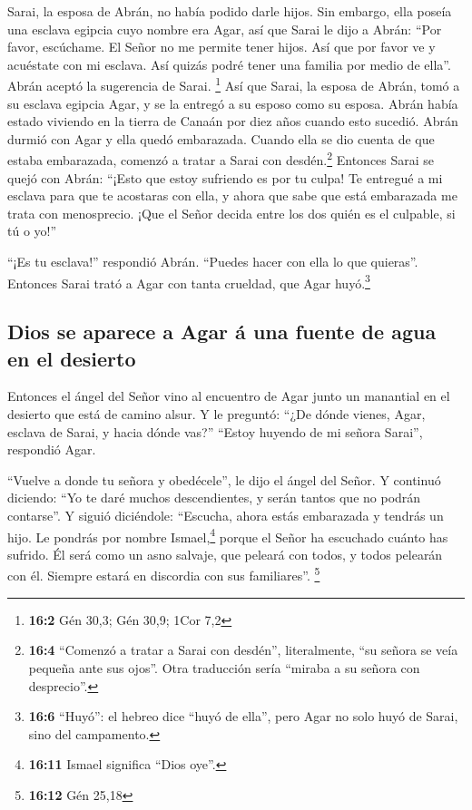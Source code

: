  Sarai, la esposa de Abrán, no había podido darle hijos.
Sin embargo, ella poseía una esclava egipcia cuyo nombre era Agar,
 así que Sarai le dijo a Abrán: ``Por favor, escúchame. El
Señor no me permite tener hijos. Así que por favor ve y acuéstate con mi
esclava. Así quizás podré tener una familia por medio de ella''. Abrán
aceptó la sugerencia de Sarai. \footnote{\textbf{16:2} Gén 30,3; Gén
  30,9; 1Cor 7,2}  Así que Sarai, la esposa de Abrán, tomó
a su esclava egipcia Agar, y se la entregó a su esposo como su esposa.
Abrán había estado viviendo en la tierra de Canaán por diez años cuando
esto sucedió.  Abrán durmió con Agar y ella quedó
embarazada. Cuando ella se dio cuenta de que estaba embarazada, comenzó
a tratar a Sarai con desdén.\footnote{\textbf{16:4} ``Comenzó a tratar a
  Sarai con desdén'', literalmente, ``su señora se veía pequeña ante sus
  ojos''. Otra traducción sería ``miraba a su señora con desprecio''.}
 Entonces Sarai se quejó con Abrán: ``¡Esto que estoy
sufriendo es por tu culpa! Te entregué a mi esclava para que te
acostaras con ella, y ahora que sabe que está embarazada me trata con
menosprecio. ¡Que el Señor decida entre los dos quién es el culpable, si
tú o yo!''

 ``¡Es tu esclava!'' respondió Abrán. ``Puedes hacer con
ella lo que quieras''. Entonces Sarai trató a Agar con tanta crueldad,
que Agar huyó.\footnote{\textbf{16:6} ``Huyó'': el hebreo dice ``huyó de
  ella'', pero Agar no solo huyó de Sarai, sino del campamento.}

\hypertarget{dios-se-aparece-a-agar-uxe1-una-fuente-de-agua-en-el-desierto}{%
\subsection{Dios se aparece a Agar á una fuente de agua en el
desierto}\label{dios-se-aparece-a-agar-uxe1-una-fuente-de-agua-en-el-desierto}}

 Entonces el ángel del Señor vino al encuentro de Agar
junto un manantial en el desierto que está de camino alsur.
 Y le preguntó: ``¿De dónde vienes, Agar, esclava de
Sarai, y hacia dónde vas?'' ``Estoy huyendo de mi señora Sarai'',
respondió Agar.

 ``Vuelve a donde tu señora y obedécele'', le dijo el
ángel del Señor.  Y continuó diciendo: ``Yo te daré
muchos descendientes, y serán tantos que no podrán contarse''.
 Y siguió diciéndole: ``Escucha, ahora estás embarazada y
tendrás un hijo. Le pondrás por nombre Ismael,\footnote{\textbf{16:11}
  Ismael significa ``Dios oye''.} porque el Señor ha escuchado cuánto
has sufrido.  Él será como un asno salvaje, que peleará
con todos, y todos pelearán con él. Siempre estará en discordia con sus
familiares''. \footnote{\textbf{16:12} Gén 25,18}


